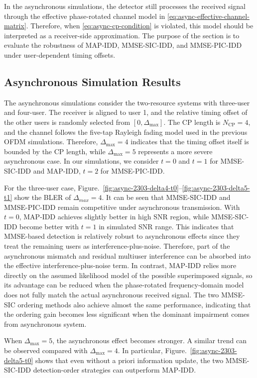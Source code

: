 In the asynchronous simulations, the detector still processes the received signal through the effective phase-rotated channel model in \eqref{eq:async-effective-channel-matrix}. Therefore, when \eqref{eq:async-cp-condition} is violated, this model should be interpreted as a receiver-side approximation. The purpose of the section is to evaluate the robustness of MAP-IDD, MMSE-SIC-IDD, and MMSE-PIC-IDD under user-dependent timing offsets.


\subsection{Asynchronous Simulation Results}
The asynchronous simulations consider the two-resource systems with three-user and four-user. The receiver is aligned to user 1, and the relative timing offset of the other users is randomly selected from $[0,\Delta_{\max}]$. The CP length is $N_{\mathrm{CP}}=4$, and the channel follows the five-tap Rayleigh fading model used in the previous OFDM simulations. Therefore, $\Delta_{\max}=4$ indicates that the timing offset itself is bounded by the CP length, while $\Delta_{\max}=5$ represents a more severe asynchronous case.
In our simulations, we consider $t=0$ and $t=1$ for MMSE-SIC-IDD and MAP-IDD, $t=2$ for MMSE-PIC-IDD.


For the three-user case, Figure.~\ref{fig:async-2303-delta4-t0}--\ref{fig:async-2303-delta5-t1} show the BLER of $\Delta_{max}=4$. 
It can be seen that MMSE-SIC-IDD and MMSE-PIC-IDD remain competitive under asynchronous transmission. 
With $t=0$, MAP-IDD achieves slightly better in high SNR region, while MMSE-SIC-IDD become better with $t=1$ in simulated SNR range. This indicates that MMSE-based detection is relatively robust to asynchronous effects since they treat the remaining users as interference-plus-noise. Therefore, part of the asynchronous mismatch and residual multiuser interference can be absorbed into the effective interference-plus-noise term.
In contrast, MAP-IDD relies more directly on the assumed likelihood model of the possible superimposed signals, so its advantage can be reduced when the phase-rotated frequency-domain model does not fully match the actual asynchronous received signal.
The two MMSE-SIC ordering methods also achieve almost the same performance, indicating that the ordering gain becomes less significant when the dominant impairment comes from asynchronous system.

When $\Delta_{\max}=5$, the asynchronous effect becomes stronger. A similar trend can be observed compared with $\Delta_{\max}=4$. In particular, Figure.~\ref{fig:async-2303-delta5-t0} shows that even without a priori information update, the two MMSE-SIC-IDD detection-order strategies can outperform MAP-IDD.


